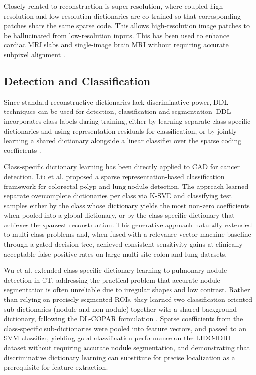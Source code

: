 Closely related to reconstruction is super-resolution, where coupled high-resolution and low-resolution dictionaries are co-trained
so that corresponding patches share the same sparse code. This allows high-resolution image patches to be hallucinated from
low-resolution inputs. This has been used to enhance cardiac MRI slabs and single-image brain MRI without requiring accurate
subpixel alignment \cite{rueda2013single}.

\subsection{Detection and Classification}

Since standard reconstructive dictionaries lack discriminative power, DDL techniques can be used for detection,
classification and segmentation. DDL incorporates class labels during training, either by learning separate class-specific
dictionaries and using representation residuals for classification, or by jointly learning a shared dictionary alongside
a linear classifier over the sparse coding coefficients \cite{tong2016dictionary}.

Class-specific dictionary learning has been directly applied to CAD for cancer detection. Liu et al. \cite{liu2011sparse}
proposed a sparse representation-based classification framework for colorectal polyp and lung nodule detection.
The approach learned separate overcomplete dictionaries per class via K-SVD and classifying test samples either by the class
whose dictionary yields the most non-zero coefficients when pooled into a global dictionary, or by the class-specific dictionary
that achieves the sparsest reconstruction. This generative approach naturally extended to multi-class problems and,
when fused with a relevance vector machine baseline through a gated decision tree, achieved consistent sensitivity gains at
clinically acceptable false-positive rates on large multi-site colon and lung datasets.

Wu et al. \cite{wu2016dictionary} extended class-specific
dictionary learning to pulmonary nodule detection in CT, addressing the practical problem that accurate nodule segmentation is
often unreliable due to irregular shapes and low contrast. Rather than relying on precisely segmented ROIs, they learned two
classification-oriented sub-dictionaries (nodule and non-nodule) together with a shared background dictionary, following the
DL-COPAR formulation \cite{kong2012dictionary}. Sparse coefficients from the class-specific sub-dictionaries were pooled into feature vectors,
and passed to an SVM classifier, yielding good classification performance on the
LIDC-IDRI dataset without requiring accurate nodule segmentation, and demonstrating that discriminative dictionary learning can
substitute for precise localization as a prerequisite for feature extraction.

